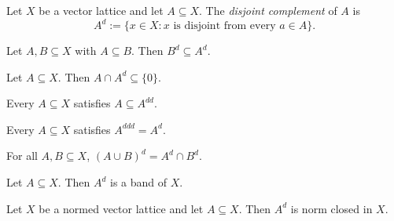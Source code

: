 \begin{definition}
\label{def:disjointComplement}
\leanok
{}
Let $X$ be a vector lattice and let $A \subseteq X$. The \emph{disjoint
complement} of $A$ is
\[
  A^d := \{x \in X : \text{$x$ is disjoint from every $a \in A$}\}.
\]
\end{definition}

\begin{lemma}
\label{lem:disjointComplement-anti}
\leanok
{}
Let $A, B \subseteq X$ with $A \subseteq B$. Then $B^d \subseteq A^d$.
\end{lemma}

\begin{lemma}
\label{lem:disjointComplement-inter-eq-zero}
\leanok
{}
Let $A \subseteq X$. Then $A \cap A^d \subseteq \{0\}$.
\end{lemma}

\begin{lemma}
\label{lem:subset-disjointComplement-disjointComplement}
\leanok
{}
Every $A \subseteq X$ satisfies $A \subseteq A^{dd}$.
\end{lemma}

\begin{lemma}
\label{lem:disjointComplement-disjointComplement-disjointComplement}
\leanok
{}
Every $A \subseteq X$ satisfies $A^{ddd} = A^d$.
\end{lemma}

\begin{lemma}
\label{lem:disjointComplement-union}
\leanok
{}
For all $A, B \subseteq X$, $(A \cup B)^d = A^d \cap B^d$.
\end{lemma}

\begin{lemma}
\label{lem:band-disjointComplement}
\leanok
{}
Let $A \subseteq X$. Then $A^d$ is a band of $X$.
\end{lemma}

\begin{lemma}
\label{lem:isClosed-disjointComplement}
\leanok
{}
Let $X$ be a normed vector lattice and let $A \subseteq X$. Then $A^d$
is norm closed in $X$.
\end{lemma}

